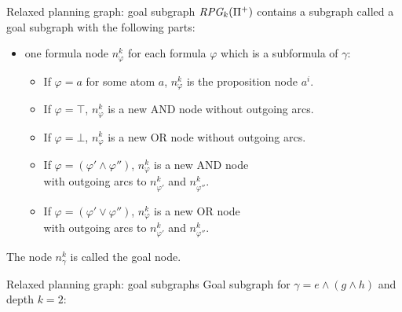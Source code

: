 \documentclass{gkibeamer}
\begin{document}
\begin{frame}{Relaxed planning graph: goal subgraph}
  $\textit{RPG}_k({\Pi}^+)$ contains a subgraph called a
  \alert{goal subgraph} with the following parts:
  \begin{itemize}
  \item one \alert{formula node $n^k_\varphi$} for each
    formula $\varphi$ which is a subformula of $\gamma$:
    \begin{itemize}
    \item If $\varphi = a$ for some atom $a$,
      $n^k_\varphi$ is the proposition node $a^i$.
    \item If $\varphi = \top$, $n^k_\varphi$ is a new AND node
      without outgoing arcs.
    \item If $\varphi = \bot$, $n^k_\varphi$ is a new OR node
      without outgoing arcs.
    \item If $\varphi = (\varphi' \land \varphi'')$,
      $n^k_\varphi$ is a new AND node \\
      with outgoing arcs to $n^k_{\varphi'}$ and $n^k_{\varphi''}$.
    \item If $\varphi = (\varphi' \lor \varphi'')$,
      $n^k_\varphi$ is a new OR node \\
      with outgoing arcs to $n^k_{\varphi'}$ and $n^k_{\varphi''}$.
    \end{itemize}
  \end{itemize}
  The node $n^k_\gamma$ is called the \alert{goal node}.
\end{frame}

\begin{frame}{Relaxed planning graph: goal subgraphs}
  Goal subgraph for \alert{$\gamma = e \land (g \land h)$}
  and depth \alert{$k = 2$}:

  \begin{center}
  \end{center}
\end{frame}
\end{document}
